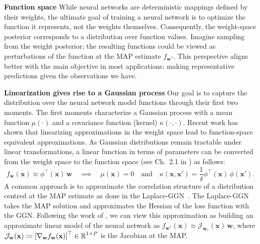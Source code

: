 \documentclass{article}
\newcommand{\weights}{\ensuremath{\mathbf{w}}}
\newcommand{\mbf}[1]{\mathbf{#1}}
\newcommand{\T}{\top}
\newcommand{\vx}{\mbf{x}}
\newcommand{\vw}{\mbf{w}}
\newcommand{\Jac}[2]{\mathcal{J}_{#1}(#2)}
\begin{document}
\textbf{Function space} 
While neural networks are deterministic mappings defined by their weights, the ultimate goal of training a neural network is to optimize the function it represents, not the weights themselves. Consequently, the weight-space posterior corresponds to a distribution over function values. Imagine sampling from the weight posterior; the resulting functions could be viewed as perturbations of the function at the MAP estimate $f_{\vw^*}$. This perspective aligns better with the main objective in most applications: making representative predictions given the observations we have.


\textbf{Linearization gives rise to a Gaussian process}
Our goal is to capture the distribution over the neural network model functions through their first two moments. The first moments characterize a Gaussian process with a mean function $\mu(\cdot)$ and a covariance function (kernel) $\kappa(\cdot,\cdot)$. 
Recent work \cite{khan2019approximate,maddox2021fast} has shown that linearizing approximations in the weight space lead to function-space equivalent approximations.
As Gaussian distributions remain tractable under linear transformations, a linear function in terms of parameters can be converted from the weight space to the function space (see Ch.~2.1 in \cite{rasmussen2006gaussian}) as follows:
%
\begin{equation} \label{eq:weight_func}
f_\weights(\vx) \approx 
\phi^\top\!(\vx) \, \vw \quad\implies\quad \mu(\vx) = 0 \quad \text{and} \quad \kappa(\vx, \vx') = \frac{1}{\delta} \phi^\T\!(\vx) \, \phi(\vx').
\end{equation}
A common approach is to approximate the correlation structure of a distribution centred at the MAP estimate as done in the Laplace-GGN~\cite{khan2019approximate, daxberger2021laplace, maddox2021fast}. 
The Laplace-GGN takes the MAP solution and approximates the Hessian of the loss function
with the GGN.
Following the work of \citet{khan2019approximate}, we can view this approximation as building an approximate linear model of the neural network as $f_{\weights^*}(\vx) \approx 
\Jac{\weights_*}{\vx} \, \weights$, where $\Jac{\weights}{\vx} \coloneqq \left[ \nabla_\weights f_\weights(\vx)\right]^\top \in \R^{1 \times P}$ is the Jacobian at the MAP.
\end{document}
